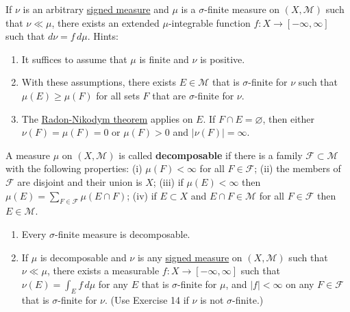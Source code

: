 	\begin{exercise}[Folland 3.14]
		If $\nu$ is an arbitrary \hyperref[def:signed-measure]{signed measure} and $\mu$ is a $\sigma$-finite measure on $(X, \mathcal{M})$ such that $\nu \ll \mu$, there exists an extended $\mu$-integrable function $f : X \to [-\infty, \infty]$ such that $d\nu = f \, d\mu$. Hints:
		\begin{enumerate}[label=\textbf{\alph*.}]
			\item It suffices to assume that $\mu$ is finite and $\nu$ is positive.
			\item With these assumptions, there exists $E \in \mathcal{M}$ that is $\sigma$-finite for $\nu$ such that $\mu(E) \ge \mu(F)$ for all sets $F$ that are $\sigma$-finite for $\nu$.
			\item The \hyperref[thm:rn-der]{Radon-Nikodym theorem} applies on $E$. If $F \cap E = \varnothing$, then either $\nu(F) = \mu(F) = 0$ or $\mu(F) > 0$ and $|\nu(F)| = \infty$.
		\end{enumerate}
	\end{exercise}
	\begin{solution}

	\end{solution}

	\begin{exercise}[Folland 3.15]
		A measure $\mu$ on $(X, \mathcal{M})$ is called \textbf{decomposable} if there is a family $\mathcal{F} \subset \mathcal{M}$ with the following properties: (i) $\mu(F) < \infty$ for all $F \in \mathcal{F}$; (ii) the members of $\mathcal{F}$ are disjoint and their union is $X$; (iii) if $\mu(E) < \infty$ then $\mu(E) = \sum_{F \in \mathcal{F}} \mu(E \cap F)$; (iv) if $E \subset X$ and $E \cap F \in \mathcal{M}$ for all $F \in \mathcal{F}$ then $E \in \mathcal{M}$.
		\begin{enumerate}[label=\textbf{\alph*.}]
			\item Every $\sigma$-finite measure is decomposable.
			\item If $\mu$ is decomposable and $\nu$ is any \hyperref[def:signed-measure]{signed measure} on $(X, \mathcal{M})$ such that $\nu \ll \mu$, there exists a measurable $f : X \to [-\infty, \infty]$ such that $\nu(E) = \int_E f \, d\mu$ for any $E$ that is $\sigma$-finite for $\mu$, and $|f| < \infty$ on any $F \in \mathcal{F}$ that is $\sigma$-finite for $\nu$. (Use Exercise 14 if $\nu$ is not $\sigma$-finite.)
		\end{enumerate}
	\end{exercise}
	\begin{solution}

	\end{solution}

